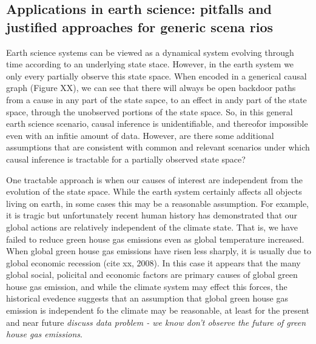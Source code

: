 \documentclass[12pt]{article}
\begin{document}

\subsection{Applications in earth science: pitfalls and justified
  approaches for generic scena
  rios}




Earth science systems can be viewed as a dynamical system evolving
through time according to an underlying state stace. However, in
the earth system we only every partially observe this state
space. When encoded in a generical causal graph (Figure XX), we
can see that there will always be open backdoor paths from a cause
in any part of the state sapce, to an effect in andy part of the
state space, through the unobserved portions of the state
space. So, in this general earth science scenario, causal
inference is unidentifiable, and thereofor impossible even with an
infitie amount of data. However, are there some additional
assumptions that are consistent with common and relevant scenarios
under which causal inference is tractable for a partially observed
state space?


One tractable approach is when our causes of interest are
independent from the evolution of the state space. While the earth
system certainly affects all objects living on earth, in some
cases this may be a reasonable assumption. For example, it is
tragic but unfortunately recent human history has demonstrated
that our global actions are relatively independent of the climate
state. That is, we have failed to reduce green house gas emissions
even as global temperature increased. When global green house gas
emissions have risen less sharply, it is usually due to global
economic recession (cite xx, 2008). In this case it appears that
the many global social, policital and economic factors are primary
causes of global green house gas emission, and while the climate
system may effect this forces, the historical evedence suggests
that an assumption that global green house gas emission is
independent fo the climate may be reasonable, at least for the
present and near future \emph{discuss data problem - we know don't
observe the future of green house gas emissions}.
\end{document}
